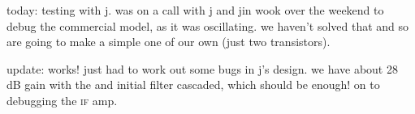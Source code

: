 today: \lna testing with j. was on a call with j and jin wook over the weekend
to debug the commercial model, as it was oscillating. we haven't solved that
and so are going to make a simple one of our own (just two transistors).

update: works! just had to work out some bugs in j's design. we have about 28
dB gain with the \lna and initial \rf filter cascaded, which should be enough!
on to debugging the \textsc{if} amp.
